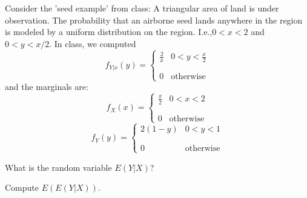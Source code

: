 \documentclass{article}
\newcommand{\pdf}[2]{\left\{\begin{matrix}
{#1} & {#2}\\\\\\0&\textrm{otherwise}
\end{matrix}\right.}
\begin{document}
\vspace{1pc}

\begin{problem}{20}
Consider the 'seed example' from class: A triangular area of land is under observation. The probability that an airborne seed lands anywhere in the region is modeled by a uniform distribution on the region. I.e.,$0<x<2$ and $0<y<x/2$. In class, we computed 
$$f_{Y|x}(y) = \pdf{\frac2{x}}{0<y<\frac{x}2}$$  
and the marginals are:\\
$$f_X(x) = \pdf{\frac{x}2}{0<x<2}$$
$$f_Y(y) = \pdf{2(1-y)}{0<y<1}$$
\vspace{1pc}

What is the random variable $E(Y|X)$?
\vspace{1pc}

Compute $E(E(Y|X))$.

\end{problem}



\showpoints
\end{document}
